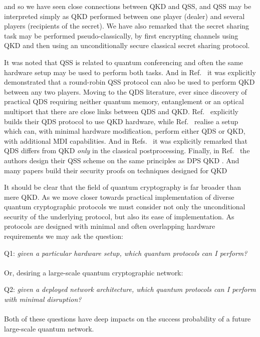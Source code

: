 
and so we have seen close connections between QKD and QSS, and QSS may be interpreted simply as QKD performed between one player (dealer) and several players (recipients of the secret). We have also remarked that the secret sharing task may be performed pseudo-classically, by first encrypting channels using QKD and then using an unconditionally secure classical secret sharing protocol. 

It was noted  that QSS is related to quantum conferencing and often the same hardware setup may be used to perform both tasks. And in Ref.~ it was explicitly demonstrated that a round-robin QSS protocol can also be used to perform QKD between any two players. Moving to the QDS literature, ever since discovery of practical QDS requiring neither quantum memory, entanglement or an optical multiport that there are close links between QDS and QKD. Ref.~ explicitly builds their QDS protocol to use QKD hardware, while Ref.~ realise a setup which can, with minimal hardware modification, perform either QDS or QKD, with additional MDI capabilities. And in Refs.~ it was explicitly remarked that QDS differs from QKD \emph{only} in the classical postprocessing. Finally, in Ref.~ the authors design their QSS scheme on the same principles as DPS QKD . And many papers build their security proofs on techniques designed for QKD 


It should be clear that the field of quantum cryptography is far broader than mere QKD. As we move closer towards practical implementation of diverse quantum cryptographic protocols we must consider not only the unconditional security of the underlying protocol, but also its ease of implementation. As protocols are designed with minimal and often overlapping hardware requirements we may ask the question:
\\
\par
Q1:\emph{ given a particular hardware setup, which quantum protocols can I perform?}
\\
\\
\noindent Or, desiring a large-scale quantum cryptographic network:
\\
\par
Q2:\emph{ given a deployed network architecture, which quantum protocols can I perform with minimal disruption?}
\\
\\
\noindent Both of these questions have deep impacts on the success probability of a future large-scale quantum network. 

